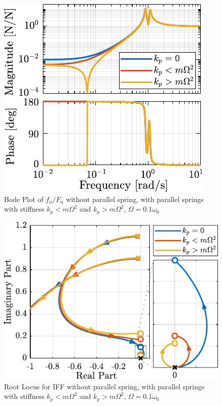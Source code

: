 \documentclass{ISMA_USD2020}
\begin{document}
\begin{figure}[htbp]
\centering
\includegraphics[scale=1]{figs/plant_iff_kp.pdf}
\caption{\label{fig:plant_iff_kp}Bode Plot of \(f_u/F_u\) without parallel spring, with parallel springs with stiffness \(k_p < m \Omega^2\) and \(k_p > m \Omega^2\), \(\Omega = 0.1 \omega_0\)}
\end{figure}

\begin{figure}[htbp]
\centering
\includegraphics[scale=1]{figs/root_locus_iff_kp.pdf}
\caption{\label{fig:root_locus_iff_kp}Root Locus for IFF without parallel spring, with parallel springs with stiffness \(k_p < m \Omega^2\) and \(k_p > m \Omega^2\), \(\Omega = 0.1 \omega_0\)}
\end{figure}
\end{document}
